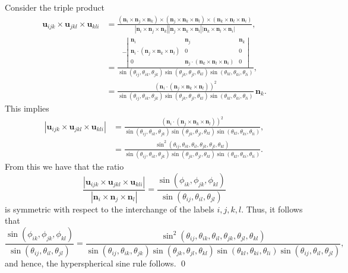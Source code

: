 \documentclass[fleqn,11pt,twoside]{article}
\makeatletter
\renewenvironment{proof}[1][\proofname]{\par
  \normalfont
  \topsep6\p@\@plus6\p@ \trivlist
  \item[\hskip\labelsep\textbf{%
    #1\@addpunct{.}}]\ignorespaces
}{%
  \qed\endtrivlist
}
\theoremstyle{definition}
\makeatother
\begin{document}
\begin{proof}
Consider the triple product
\begin{equation}\label{eq:47}
\begin{split}
\textbf{u}_{ijk}\times\textbf{u}_{jkl}\times\textbf{u}_{kli}&=\frac{(\textbf{n}_i\times\textbf{n}_j\times\textbf{n}_k)\times(\textbf{n}_j\times\textbf{n}_k\times\textbf{n}_l)\times(\textbf{n}_k\times\textbf{n}_l\times\textbf{n}_i)}
{|\textbf{n}_i\times\textbf{n}_j\times\textbf{n}_k||\textbf{n}_j\times\textbf{n}_k\times\textbf{n}_l||\textbf{n}_k\times\textbf{n}_l\times\textbf{n}_i|},\\
&=\frac{-\left|\begin{array}{ccc}
\textbf{n}_i & \textbf{n}_j & \textbf{n}_k \\
\textbf{n}_i\cdot(\textbf{n}_j\times\textbf{n}_k\times\textbf{n}_l) & 0& 0\\
0 & \textbf{n}_j\cdot(\textbf{n}_k\times\textbf{n}_l\times\textbf{n}_i)& 0
\end{array}\right|}
{\sin(\theta_{ij},\theta_{ik},\theta_{jk})\sin(\theta_{jk},\theta_{jl},\theta_{kl})\sin(\theta_{kl},\theta_{ki},\theta_{li})},\\
&=\frac{\left(\textbf{n}_i\cdot(\textbf{n}_j\times\textbf{n}_k\times\textbf{n}_l)\right)^2}{\sin(\theta_{ij},\theta_{ik},\theta_{jk})\sin(\theta_{jk},\theta_{jl},\theta_{kl})\sin(\theta_{kl},\theta_{ki},\theta_{li})}\,\textbf{n}_k.
\end{split}
\end{equation}
This implies
\begin{equation}
\begin{split}
|\textbf{u}_{ijk}\times\textbf{u}_{jkl}\times\textbf{u}_{kli}|&=\frac{\left(\textbf{n}_i\cdot(\textbf{n}_j\times\textbf{n}_k\times\textbf{n}_l)\right)^2}{\sin(\theta_{ij},\theta_{ik},\theta_{jk})\sin(\theta_{jk},\theta_{jl},\theta_{kl})\sin(\theta_{kl},\theta_{ki},\theta_{li})},\\
&=\frac{\sin^2(\theta_{ij},\theta_{ik},\theta_{il},\theta_{jk},\theta_{jl},\theta_{kl})}{\sin(\theta_{ij},\theta_{ik},\theta_{jk})\sin(\theta_{jk},\theta_{jl},\theta_{kl})\sin(\theta_{kl},\theta_{ki},\theta_{li})}.
\end{split}
\end{equation}
From this we have that the ratio
\begin{equation}\label{ratio2}
\frac{|\textbf{u}_{ijk}\times\textbf{u}_{jkl}\times\textbf{u}_{kli}|}{|\textbf{n}_i\times\textbf{n}_j\times\textbf{n}_l|}=\frac{\sin(\phi_{ik},\phi_{jk},\phi_{kl})}{\sin(\theta_{ij},\theta_{il},\theta_{jl})}
\end{equation}
is symmetric with respect to the interchange of the labels $i,j,k,l$. Thus, it follows that
\begin{equation}
\frac{\sin(\phi_{ik},\phi_{jk},\phi_{kl})}{\sin(\theta_{ij},\theta_{il},\theta_{jl})}=\frac{\sin^2(\theta_{ij},\theta_{ik},\theta_{il},\theta_{jk},\theta_{jl},\theta_{kl})}{\sin(\theta_{ij},\theta_{ik},\theta_{jk})\sin(\theta_{jk},\theta_{jl},\theta_{kl})\sin(\theta_{kl},\theta_{ki},\theta_{li})\sin(\theta_{ij},\theta_{il},\theta_{jl})},
\end{equation}
and hence, the hyperspherical sine rule follows.
\end{proof}
\end{document}
